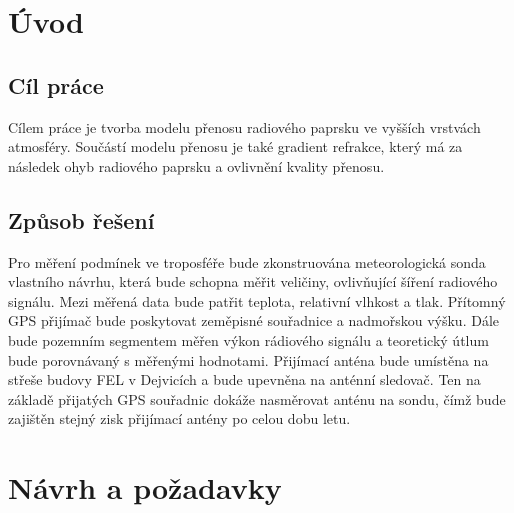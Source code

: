 \documentclass[twoside]{ctuthesis}
\theoremstyle{plain}
\theoremstyle{definition}
\theoremstyle{note}
\begin{document}
\maketitle

\chapter{Úvod}
	\section{Cíl práce}
	Cílem práce je tvorba modelu přenosu radiového paprsku ve vyšších vrstvách atmosféry. Součástí modelu přenosu je také gradient refrakce, který má za následek ohyb radiového paprsku a ovlivnění kvality přenosu.
	

	\section{Způsob řešení}
	Pro měření podmínek ve troposféře bude zkonstruována meteorologická sonda vlastního návrhu, která bude schopna měřit veličiny, ovlivňující šíření radiového signálu. Mezi měřená data bude patřit teplota, relativní vlhkost a tlak. Přítomný GPS přijímač bude poskytovat zeměpisné souřadnice a nadmořskou výšku. Dále bude pozemním segmentem měřen výkon rádiového signálu a teoretický útlum bude porovnávaný s měřenými hodnotami. Přijímací anténa bude umístěna na střeše budovy FEL v Dejvicích a bude upevněna na anténní sledovač. Ten na základě přijatých GPS souřadnic dokáže nasměrovat anténu na sondu, čímž bude zajištěn stejný zisk přijímací antény po celou dobu letu.




	




























	

\chapter{Návrh a požadavky}
\end{document}
